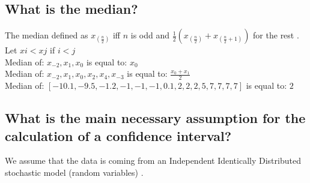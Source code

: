 \documentclass [12 pt , a4paper ] {article}
\begin{document}
\subsection{ What is the median?}
\par The median defined as $x_{(\frac{n}{2})}$ iff $n$ is odd and $\frac{1}{2}(x_{(\frac{n}{2})} + x_{(\frac{n}{2}+1)})$ for the rest \cite{leboudec}.
\\ Let $xi<xj$ if $i<j$
\\ Median of: $x_{-2}, x_1,x_0$ is equal to: $x_0$
\\ Median of: $x_{-2}, x_1,x_0,x_2,x_4,x_{-3}$ is equal to: $\frac{x_0+x_1}{2}$
\\ Median of: $ [-10.1, -9.5, -1.2, -1, -1, -1, 0.1, 2, 2, 2, 5, 7, 7, 7, 7] $ is equal to: $2$
\subsection{What is the main necessary assumption for the calculation of a confidence interval?}
\par We assume that the data is coming from an
Independent Identically Distributed stochastic model (random variables) \cite{leboudec}.
\end{document}
